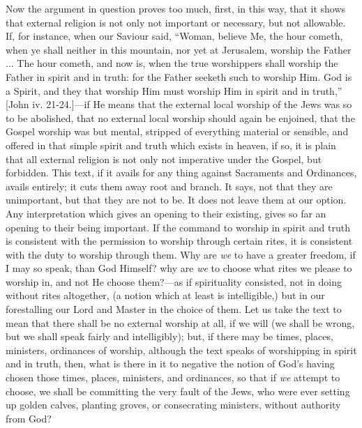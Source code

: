 Now the argument in question proves too much, first, in this way,
that it shows that external religion is not only not important or
necessary, but not allowable. If, for instance, when our Saviour said,
``Woman, believe Me, the hour cometh, when ye shall neither in
this mountain, nor yet at Jerusalem, worship the Father ... The hour
cometh, and now is, when the true worshippers shall worship the Father
in spirit and in truth: for the Father seeketh such to worship Him.
God is a Spirit, and they that worship Him must worship Him in spirit
and in truth,'' [John iv. 21-24.]—if He means that the
external local worship of the Jews was so to be abolished, that no
external local worship should again be enjoined, that the Gospel
worship was but mental, stripped of everything material or sensible,
and offered in that simple spirit and truth which exists in heaven, if
so, it is plain that all external religion is not only not imperative
under the Gospel, but forbidden. This text, if it avails for any
thing against Sacraments and Ordinances, avails entirely; it cuts them
away root and branch. It says, not that they are unimportant, but that
they are not to be. It does not leave them at our option. Any
interpretation which gives an opening to their existing, gives so far
an opening to their being important. If the command to worship in
spirit and truth is consistent with the permission to worship through
certain rites, it is consistent with the duty to worship through them.
Why are \emph{we} to have a greater freedom, if I may so speak, than
God Himself? why are \emph{we} to choose what rites we please to
worship in, and not He choose them?—as if spirituality consisted,
not in doing without rites altogether, (a notion which at least is
intelligible,) but in our forestalling our Lord and Master in the
choice of them. Let us take the text to mean that there shall be no
external worship at all, if we will (we shall be wrong, but we shall
speak fairly and intelligibly); but, if there may be times, places,
ministers, ordinances of worship, although the text speaks of
worshipping in spirit and in truth, then, what is there in it to
negative the notion of God's having chosen those times, places,
ministers, and ordinances, so that if \emph{we} attempt to choose, we
shall be committing the very fault of the Jews, who were ever setting
up golden calves, planting groves, or consecrating ministers, without
authority from God?


